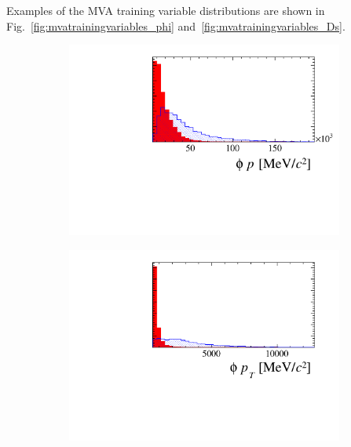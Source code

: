 Examples of the MVA training variable distributions are shown in Fig.~\ref{fig:mvatrainingvariables_phi} and~\ref{fig:mvatrainingvariables_Ds}.
\begin{figure}[!h]
   \centering
   \begin{subfigure}[t]{0.22\textwidth}
      \centering
      \includegraphics[width=1.0\textwidth]{figs/Selection/Phi_BDT_Var_Ds2KKPi_Phi_P.pdf}
   \end{subfigure}
   \begin{subfigure}[t]{0.22\textwidth}
      \centering
      \includegraphics[width=1.0\textwidth]{figs/Selection/Phi_BDT_Var_Ds2KKPi_Phi_PT.pdf}
   \end{subfigure}
   \begin{subfigure}[t]{0.22\textwidth}

\end{subfigure}
\end{figure}
